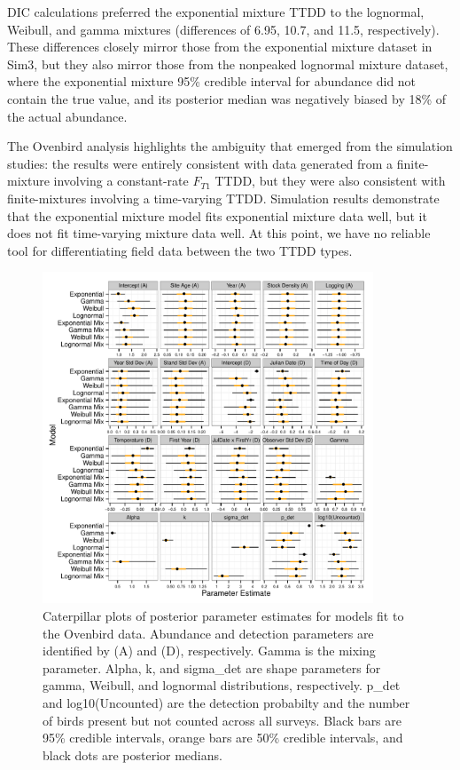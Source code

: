 \documentclass[useAMS,usenatbib,referee,12pt]{article}
\begin{document}
DIC calculations preferred the exponential mixture TTDD to the lognormal, Weibull, and gamma mixtures (differences of 6.95, 10.7, and 11.5, respectively). These differences closely mirror those from the exponential mixture dataset in Sim3, but they also mirror those from the nonpeaked lognormal mixture dataset, where the exponential mixture 95\% credible interval for abundance did not contain the true value, and its posterior median was negatively biased by 18\% of the actual abundance.

The Ovenbird analysis highlights the ambiguity that emerged from the simulation studies: the results were entirely consistent with data generated from a finite-mixture involving a constant-rate $F_{T1}$ TTDD, but they were also consistent with finite-mixtures involving a time-varying TTDD.
Simulation results demonstrate that the exponential mixture model fits exponential mixture data well, but it does not fit time-varying mixture data well.
At this point, we have no reliable tool for differentiating field data between the two TTDD types.



\begin{figure}[h!]\centering
\includegraphics[width=0.88\textwidth]{OVEN/oven_sum/OVEN_Posteriors.pdf}
\caption{\label{ovenposteriors} Caterpillar plots of posterior parameter estimates for models fit to the Ovenbird data.  
Abundance and detection parameters are identified by (A) and (D), respectively.  
Gamma is the mixing parameter.  
Alpha, k, and sigma\_det are shape parameters for gamma, Weibull, and lognormal distributions, respectively.  
p\_det and log10(Uncounted) are the detection probabilty and the number of birds present but not counted across all surveys.  
Black bars are 95\% credible intervals, orange bars are 50\% credible intervals, and black dots are posterior medians.}
\end{figure}
\end{document}
